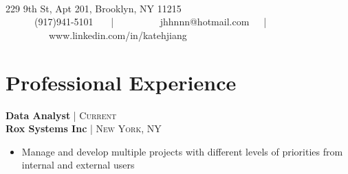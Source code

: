 \documentclass[10pt]{article} %
\begin{document}
\color{text1} %


\par{\\[0.5\baselineskip] %

{ 229 9th St, Apt 201, Brooklyn, NY 11215}\\

{\ \ \ \faMobilePhone \ \ \  (917)941-5101 \ \ \ | \ \ \  
\  \ \ \faEnvelope \ \ \ jhhnnn@hotmail.com\ \ \ | \ \ \
\  \ \ \faLinkedin \ \ \ www.linkedin.com/in/katehjiang }
	

\begin{minipage}[t]{0.5\textwidth} %
\vspace{0pt} %
	

\section{Professional Experience} 



{\raggedright\normalsize
\textbf{Data Analyst} {\hfill\footnotesize\textsc{| Current}}\\ 
\textbf{Rox Systems Inc} {\hfill\footnotesize\textsc{| New York, NY}}}

\begin{itemize}[leftmargin=*, topsep=2pt, partopsep=2.5pt]
\setlength\itemsep{1pt}

\item Manage and develop multiple projects with different levels of priorities from internal and external users


\end{itemize}
\end{minipage}}
\end{document}
